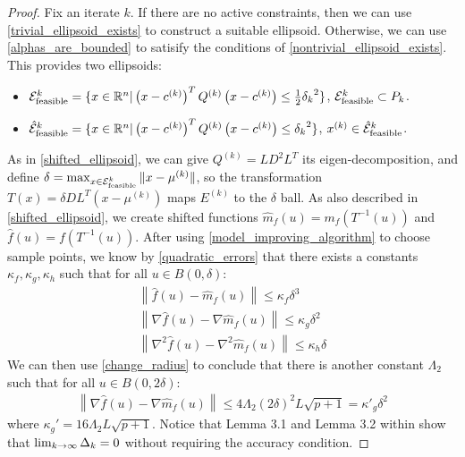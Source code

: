 \begin{proof}
Fix an iterate $k$.
If there are no active constraints, then we can use \cref{trivial_ellipsoid_exists} to construct a suitable ellipsoid.
Otherwise, we can use \cref{alphas_are_bounded} to satisify the conditions of \cref{nontrivial_ellipsoid_exists}.
This provides two ellipsoids:
\begin{itemize}
\item ${\mathcal E^k_{\textrm{feasible}}} = \{x \in \mathbb R^n | \left(x - c^{(k)} \right)^T {Q^{(k)}} \left(x - c^{(k)}\right) \le \frac 1 2 {\delta_k}^2 \}$, ${\mathcal E^k_{\textrm{feasible}}} \subset {P_k}$.
\item ${{\mathcal {\hat E}_{\text{feasible}}}^k} = \{x \in \mathbb R^n | \left(x - c^{(k)}\right)^T {Q^{(k)}} \left(x - c^{(k)}\right) \le {\delta_k}^2 \}$, $x^{(k)} \in {{\mathcal {\hat E}_{\text{feasible}}}^k}$.
\end{itemize}
As in \cref{shifted_ellipsoid}, we can give $Q^{(k)} = LD^2L^T$ its eigen-decomposition, and define $\delta = \max_{x \in {\mathcal E^k_{\textrm{feasible}}}} \|x - \mu^{(k)}\|$, 
so the transformation $T(x) = \delta D L^T(x - \mu^{(k)})$ maps $E^{(k)}$ to the $\delta$ ball.
As also described in \cref{shifted_ellipsoid}, we  create shifted functions
$\hat {m}_f(u) = m_f(T^{-1}(u))$ and
$\hat f (u) = f(T^{-1}(u))$.
After using \cref{model_improving_algorithm} to choose sample points, we know by \cref{quadratic_errors} that there exists a constants $\kappa_f, \kappa_g, \kappa_h$ such that for all $u \in B(0, \delta)$:
\begin{align*}
\left\| \hat {f}\left(u\right) -  \hat{m}_f\left(u\right) \right\|\le \kappa_f \delta^3 \\
\left\|\nabla \hat {f}\left(u\right) - \nabla \hat{m}_f\left(u\right) \right\|\le \kappa_g \delta^2 \\
\left\|\nabla^2 \hat {f}\left(u\right) - \nabla^2 \hat{m}_f\left(u\right) \right\|\le \kappa_h \delta
\end{align*}
We can then use \cref{change_radius} to conclude that there is another constant $\Lambda_2$ such that for all $u \in B(0, 2\delta)$:
\begin{align*}
\left\|\nabla \hat {f}\left(u\right) - \nabla \hat{m}_f\left(u\right) \right\|\le 4 \Lambda_2 \left(2\delta\right)^2 L \sqrt{p+1} = {\kappa'}_g\delta^2
\end{align*}
where $\kappa_{g}' = 16 \Lambda_2 L \sqrt{p+1}$.
Notice that Lemma 3.1 and Lemma 3.2 within \cite{doi:10.1080/10556788.2015.1026968} show that $\lim_{k\to\infty}\Delta_k = 0$ without requiring the accuracy condition.

\end{proof}
